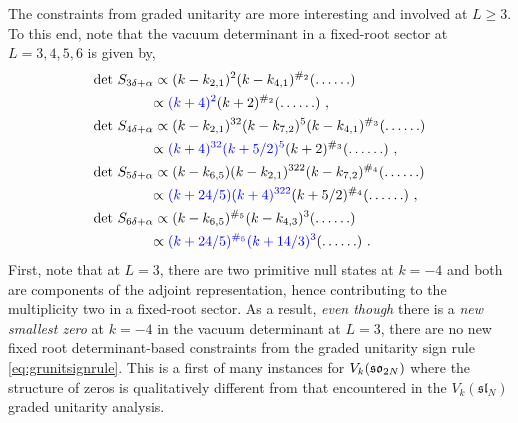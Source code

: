 The constraints from graded unitarity are more interesting and involved at $L \geqslant 3$. To this end, note that the vacuum determinant in a fixed-root sector at $L = 3,4,5,6$ is given by,
\begin{equation} \label{eq:lowlevelso8det3to6}
\begin{split}
    &\text{det}~S_{3\delta + \alpha} \propto (k - k_{2,1})^2 (k-k_{4,1})^{\#_2} (\ldots \ldots)\\ 
    &\qquad \qquad  \propto \textcolor{blue}{(k + 4)^2} (k +2 )^{\#_2} (\ldots \ldots)~,\\
    &\text{det}~S_{4\delta + \alpha} \propto (k - k_{2,1})^{32}(k-k_{7,2})^5(k-k_{4,1})^{\#_3} (\ldots \ldots)\\ 
    &\qquad \qquad  \propto \textcolor{blue}{(k + 4)^{32}(k + 5/2)^5}(k+2)^{\#_3} (\ldots \ldots)~, \\
    &\text{det}~S_{5\delta + \alpha} \propto (k - k_{6,5})(k-k_{2,1})^{322} (k-k_{7,2})^{\#_4} (\ldots \ldots)\\ 
    &\qquad \qquad  \propto \textcolor{blue}{(k+24/5)(k + 4)^{322}}(k + 5/2)^{\#_4} (\ldots \ldots)~, \\
    &\text{det}~S_{6\delta + \alpha} \propto (k - k_{6,5})^{\#_5}(k-k_{4,3})^3 (\ldots \ldots)\\ 
    &\qquad \qquad  \propto \textcolor{blue}{(k+24/5)^{\#_5}(k + 14/3)^3} (\ldots \ldots)~. \\
\end{split}
\end{equation}
First, note that at $L = 3$, there are two primitive null states at $k = -4$ and both are components of the adjoint representation, hence contributing to the multiplicity two in a fixed-root sector. As a result, \textit{even though} there is a \textit{new smallest zero} at $k = -4$ in the vacuum determinant at $L = 3$, there are no new fixed root determinant-based constraints from the graded unitarity sign rule \eqref{eq:grunitsignrule}. This is a first of many instances for $V_k(\mathfrak{so}_{2N})$ where the structure of zeros is qualitatively different from that encountered in the $V_k(\mathfrak{sl}_N)$ graded unitarity analysis. 


